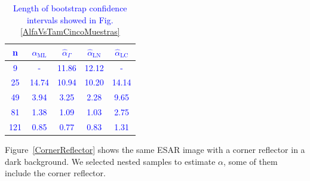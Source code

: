 \documentclass[twocolumn]{svjour3}
\begin{document}
	\begin{table}[htbp]
		\centering
		\caption{\label{tab:LongIC}Length of bootstrap confidence intervals showed in Fig.\ref{AlfaVsTamCincoMuestras}}
		\textcolor{blue}{
		\begin{tabular}{ccccc}
			\toprule 
			n     &  $\widehat{\alpha}_{\text{{ML}}}$    &  $\widehat{\alpha}_{\Gamma}$  &  $\widehat{\alpha}_{\text{{LN}}}$ &  $\widehat{\alpha}_{\text{{LC}}}$ \\
			\midrule
			9     &    -  & 11.86 & 12.12 & - \\
			25    & 14.74 & 10.94 & 10.20 & 14.14 \\
			49    & 3.94  & 3.25  & 2.28  & 9.65 \\
			81    & 1.38  & 1.09  & 1.03  & 2.75 \\
			121   & 0.85  & 0.77  & 0.83  & 1.31 \\
			\bottomrule
		\end{tabular}
	}
	\end{table}%
	
	
	
	
	Figure~\ref{CornerReflector} shows the same ESAR image with a corner reflector in a dark background. 
	We selected nested samples to estimate $\alpha$, some of them include the corner reflector.
	
\end{document}
